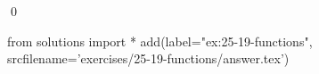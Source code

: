 
\begin{ex}
  \label{ex:25-19-functions}
  
  \qed
\end{ex}
\begin{python0}
from solutions import *
add(label="ex:25-19-functions",
    srcfilename='exercises/25-19-functions/answer.tex')
\end{python0}
